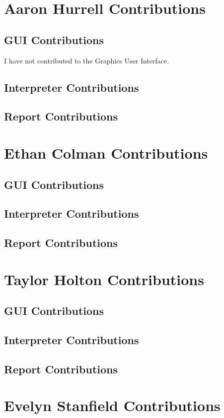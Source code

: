\documentclass[a4paper, oneside, 11pt]{report}
\begin{document}
    \section{Aaron Hurrell Contributions}
    \subsection{GUI Contributions}
    I have not contributed to the Graphics User Interface.
    \subsection{Interpreter Contributions}
    \subsection{Report Contributions}

    \section{Ethan Colman Contributions}
    \subsection{GUI Contributions}
    \subsection{Interpreter Contributions}
    \subsection{Report Contributions}

    \section{Taylor Holton Contributions}
    \subsection{GUI Contributions}
    \subsection{Interpreter Contributions}
    \subsection{Report Contributions}

    \section{Evelyn Stanfield Contributions}
\end{document}
